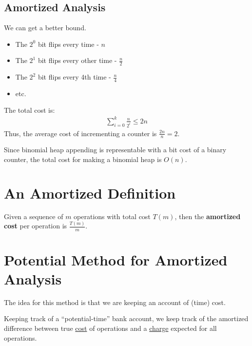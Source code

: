                 \subsection{Amortized Analysis} %
                \label{sub:amortized_analysis}
                    We can get a better bound.
                    \begin{itemize}
                        \item The $2^0$ bit flips every time - $n$
                        \item The $2^1$ bit flips every other time - $\frac{n}{2}$
                        \item The $2^2$ bit flips every 4th time - $\frac{n}{4}$
                        \item etc.
                    \end{itemize}
                    The total cost is:
                    \begin{align*}
                        \sum_{i=0}^k \frac{n}{2^i} \le 2n
                    \end{align*}
                    Thus, the average cost of incrementing a counter is $\frac{2n}{n} = 2$.

                    Since binomial heap appending is representable with a bit cost of a binary counter, the total cost for making a binomial heap is $O(n)$.
            \section{An Amortized Definition} %
            \label{sec:an_amortized_definition}
                Given a sequence of $m$ operations with total cost $T(m)$, then the \textbf{amortized cost} per operation is $\frac{T(m)}{m}$.
            \section{Potential Method for Amortized Analysis} %
            \label{sec:potential_method_for_amortized_analysis}
                The idea for this method is that we are keeping an account of (time) cost.

                Keeping track of a ``potential-time'' bank account, we keep track of the amortized difference between true \uline{cost} of operations and a \uline{charge} expected for all operations.

